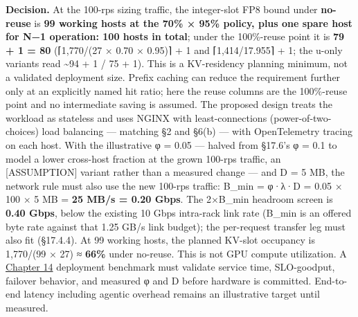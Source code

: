 \textbf{Decision.} At the 100-rps sizing traffic, the integer-slot FP8
bound under \textbf{no-reuse} is \textbf{99 working hosts at the 70\% ×
95\% policy, plus one spare host for N−1 operation: 100 hosts in total};
under the 100\%-reuse point it is \textbf{79 + 1 = 80} (⌈1,770/(27 ×
0.70 × 0.95)⌉ + 1 and ⌈1,414/17.955⌉ + 1; the u-only variants read
\textasciitilde94 + 1 / 75 + 1). This is a KV-residency planning
minimum, not a validated deployment size. Prefix caching can reduce the
requirement further only at an explicitly named hit ratio; here the
reuse columns are the 100\%-reuse point and no intermediate saving is
assumed. The proposed design treats the workload as stateless and uses
NGINX with least-connections (power-of-two-choices) load balancing ---
matching §2 and §6(b) --- with OpenTelemetry tracing on each host. With
the illustrative φ = 0.05 --- halved from §17.6's φ = 0.1 to model a
lower cross-host fraction at the grown 100-rps traffic, an
\mbox{{[}ASSUMPTION{]}} variant rather than a measured change --- and D = 5 MB,
the network rule must also use the new 100-rps traffic: B\_min = φ·λ·D =
0.05 × 100 × 5 MB = \textbf{25 MB/s = 0.20 Gbps}. The 2×B\_min headroom
screen is \textbf{0.40 Gbps}, below the existing 10 Gbps intra-rack link
rate (B\_min is an offered byte rate against that 1.25 GB/s link
budget); the per-request transfer leg must also fit (§17.4.4). At 99
working hosts, the planned KV-slot occupancy is 1,770/(99 × 27) ≈
\textbf{66\%} under no-reuse. This is not GPU compute utilization. A
\hyperref[chap:14]{Chapter 14} deployment benchmark must validate service time, SLO-goodput,
failover behavior, and measured φ and D before hardware is committed.
End-to-end latency including agentic overhead remains an illustrative
target until measured.

